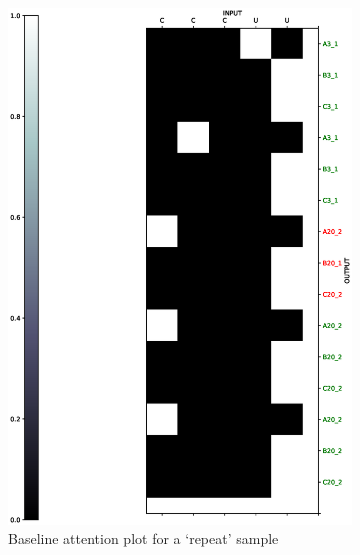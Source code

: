 \begin{figure}[ht] 
	\begin{subfigure}[b]{0.5\linewidth}
		\centering
		\includegraphics[width=0.95\linewidth]{./figs/sr/attn/baseline-eps}
		\caption{Baseline attention plot for a \lq repeat\rq{} sample} 
		\label{repeat_base} 
		\vspace{2ex}
	\end{subfigure}%
	\begin{subfigure}[b]{0.5\linewidth}
		\centering

\end{subfigure}
\end{figure}
